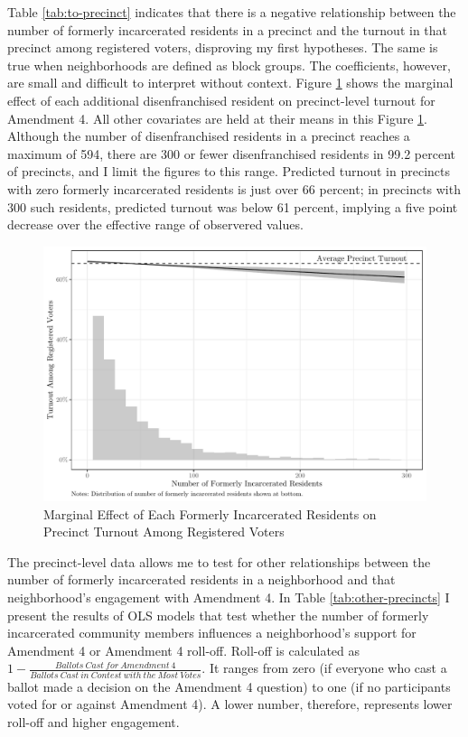 \documentclass[
  12pt,
]{article}
\begin{document}
Table \ref{tab:to-precinct} indicates that there is a negative relationship between the number of formerly incarcerated residents in a precinct and the turnout in that precinct among registered voters, disproving my first hypotheses. The same is true when neighborhoods are defined as block groups. The coefficients, however, are small and difficult to interpret without context. Figure \ref{fig:marg1} shows the marginal effect of each additional disenfranchised resident on precinct-level turnout for Amendment 4. All other covariates are held at their means in this Figure \ref{fig:marg1}. Although the number of disenfranchised residents in a precinct reaches a maximum of 594, there are 300 or fewer disenfranchised residents in 99.2 percent of precincts, and I limit the figures to this range. Predicted turnout in precincts with zero formerly incarcerated residents is just over 66 percent; in precincts with 300 such residents, predicted turnout was below 61 percent, implying a five point decrease over the effective range of observered values.

\begin{figure}[H]

{\centering \includegraphics{amendment_4_turnout_files/figure-latex/marg1-1} 

}

\caption{\label{fig:marg1}Marginal Effect of Each Formerly Incarcerated Residents on Precinct Turnout Among Registered Voters}\label{fig:marg1}
\end{figure}

The precinct-level data allows me to test for other relationships between the number of formerly incarcerated residents in a neighborhood and that neighborhood's engagement with Amendment 4. In Table \ref{tab:other-precincts} I present the results of OLS models that test whether the number of formerly incarcerated community members influences a neighborhood's support for Amendment 4 or Amendment 4 roll-off. Roll-off is calculated as \(1 - \frac{Ballots\:Cast\:for\:Amendment\:4}{Ballots\:Cast\:in\:Contest\:with\:the\:Most\:Votes}\). It ranges from zero (if everyone who cast a ballot made a decision on the Amendment 4 question) to one (if no participants voted for or against Amendment 4). A lower number, therefore, represents lower roll-off and higher engagement.
\end{document}

